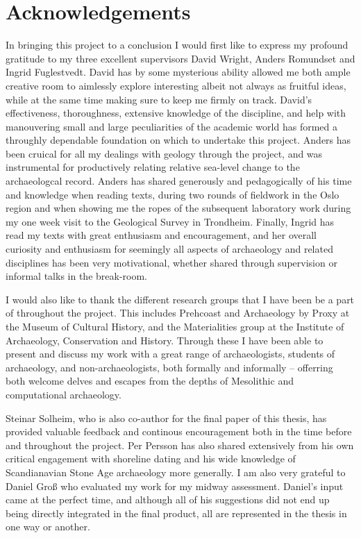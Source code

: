 \pagestyle{plain}
\setcounter{page}{3}

\section*{Acknowledgements}
In bringing this project to a conclusion I would first like to express my profound gratitude to my three excellent supervisors David Wright, Anders Romundset and Ingrid Fuglestvedt. David has by some mysterious ability allowed me both ample creative room to aimlessly explore interesting albeit not always as fruitful ideas, while at the same time making sure to keep me firmly on track. David's effectiveness, thoroughness, extensive knowledge of the discipline, and help with manouvering small and large peculiarities of the academic world has formed a throughly dependable foundation on which to undertake this project. Anders has been cruical for all my dealings with geology through the project, and was instrumental for productively relating relative sea-level change to the archaeologcal record. Anders has shared generously and pedagogically of his time and knowledge when reading texts, during two rounds of fieldwork in the Oslo region and when showing me the ropes of the subsequent laboratory work during my one week visit to the Geological Survey in Trondheim. Finally, Ingrid has read my texts with great enthusiasm and encouragement, and her overall curiosity and enthusiasm for seemingly all aspects of archaeology and related disciplines has been very motivational, whether shared through supervision or informal talks in the break-room.  

I would also like to thank the different research groups that I have been be a part of throughout the project. This includes Prehcoast and Archaeology by Proxy at the Museum of Cultural History, and the Materialities group at the Institute of Archaeology, Conservation and History. Through these I have been able to present and discuss my work with a great range of archaeologists, students of archaeology, and non-archaeologists, both formally and informally -- offerring both welcome delves and escapes from the depths of Mesolithic and computational archaeology.

Steinar Solheim, who is also co-author for the final paper of this thesis, has provided valuable feedback and continous encouragement both in the time before and throughout the project. Per Persson has also shared extensively from his own critical engagement with shoreline dating and his wide knowledge of Scandianavian Stone Age archaeology more generally. I am also very grateful to Daniel Groß who evaluated my work for my midway assessment. Daniel's input came at the perfect time, and although all of his suggestions did not end up being directly integrated in the final product, all are represented in the thesis in one way or another.

